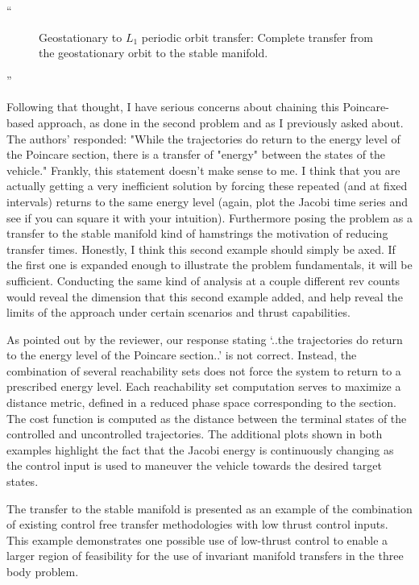 \documentclass[11pt]{article}
\newenvironment{correction}{\begin{list}{}{\setlength{\leftmargin}{1cm}\setlength{\rightmargin}{1cm}}\vspace{\parsep}\item[]``}{''\end{list}}
\begin{document}
\begin{itemize}
\begin{correction}
\begin{figure}
        \caption{Geostationary to \( L_1 \) periodic orbit transfer: Complete transfer from the geostationary orbit to the stable manifold.\label{fig:geo_transfer}}
\end{figure}
        \end{correction}
    \item 
        \begin{itshape}
            Following that thought, I have serious concerns about chaining this Poincare-based approach, as done in the second problem and as I previously asked about.  The authors' responded: "While the trajectories do return to the energy level of the Poincare section, there is a transfer of "energy" between the states of the vehicle." Frankly, this statement doesn't make sense to me.  I think that you are actually getting a very inefficient solution by forcing these repeated (and at fixed intervals) returns to the same energy level (again, plot the Jacobi time series and see if you can square it with your intuition).  Furthermore posing the problem as a transfer to the stable manifold kind of hamstrings the motivation of reducing transfer times.  Honestly, I think this second example should simply be axed.  If the first one is expanded enough to illustrate the problem fundamentals, it will be sufficient.  Conducting the same kind of analysis at a couple different rev counts would
            reveal the dimension that this second example added, and help reveal the limits of the approach under certain scenarios and thrust capabilities.
        \end{itshape}

		As pointed out by the reviewer, our response stating `..the trajectories do return to the energy level of the Poincare section..' is not correct. 
        Instead, the combination of several reachability sets does not force the system to return to a prescribed energy level.
        Each reachability set computation serves to maximize a distance metric, defined in a reduced phase space corresponding to the \Poincare section.
        The cost function is computed as the distance between the terminal states of the controlled and uncontrolled trajectories.
        The additional plots shown in both examples highlight the fact that the Jacobi energy is continuously changing as the control input is used to maneuver the vehicle towards the desired target states.

        The transfer to the stable manifold is presented as an example of the combination of existing control free  transfer methodologies with low thrust control inputs.
        This example demonstrates one possible use of low-thrust control to enable a larger region of feasibility for the use of invariant manifold transfers in the three body problem. 


\end{itemize}
\end{document}
